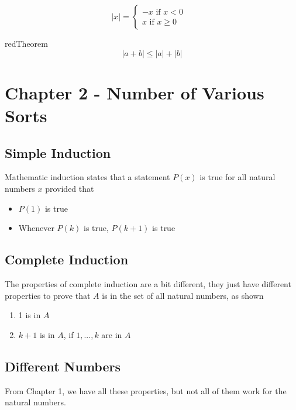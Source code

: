 \documentclass[12pt]{article}
\begin{document}
\begin{tcolorbox}[title=Absolute Value]
	$$|x| = \begin{cases} -x \text{ if } x < 0 & \\ x\text{ if } x \geq 0 \end{cases}$$
\end{tcolorbox}

\begin{mybox}{red}{Theorem}
	$$|a+b| \leq |a| + |b|$$
\end{mybox}

\newpage

\section{Chapter 2 - Number of Various Sorts}

\subsection{Simple Induction}

Mathematic induction states that a statement $P(x)$ is true for all natural numbers $x$ provided that

\begin{itemize}
	\item{$P(1)$ is true}
	\item{Whenever $P(k)$ is true, $P(k+1)$ is true}
\end{itemize}

\subsection{Complete Induction}

The properties of complete induction are a bit different, they just have different properties to prove that $A$ is in the set of all natural numbers, as shown
\begin{enumerate}
	\item{1 is in $A$}
	\item{$k+1$ is in $A$, if $1,...,k$ are in $A$}
\end{enumerate}

\subsection{Different Numbers}

From Chapter 1, we have all these properties, but not all of them work for the natural numbers.

 
\end{document}
